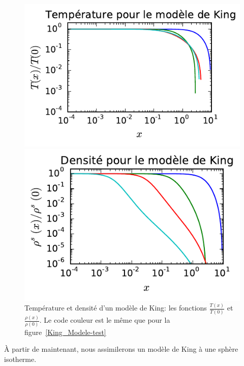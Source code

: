 \begin{figure}[hbt]
	\begin{minipage}[b]{0.48\linewidth}
		\centering \includegraphics{graphe/king_n_t_temp.pdf}
	\end{minipage}\hfill
	\begin{minipage}[b]{0.48\linewidth}
		\centering \includegraphics{graphe/king_n.pdf}
	\end{minipage}
	\caption{Température et densité d'un modèle de King: les fonctions $\frac{T(x)}{T(0)}$ et
		$\frac{\rho(x)}{\rho(0)}$. Le code couleur est le même que pour la figure~\ref{King_Modele-test}}
	\label{kingisotherme}
\end{figure}

À partir de maintenant, nous assimilerons un modèle de King à une sphère isotherme.



